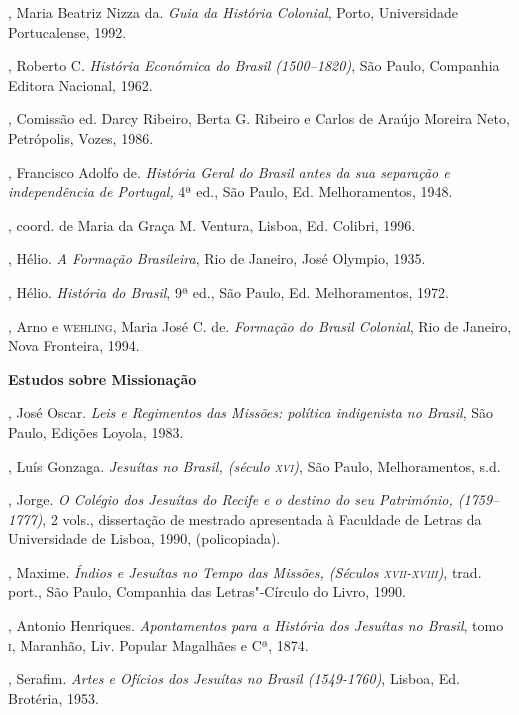 \begin{bibliohedra}
, Maria Beatriz Nizza da. \textit{Guia da História Colonial}, 
Porto, Universidade Portucalense, 1992.

, Roberto C. \textit{História Económica do Brasil
(1500--1820)}, São Paulo, Companhia Editora Nacional, 1962.

, Comissão ed. Darcy Ribeiro, Berta
G. Ribeiro e Carlos de Araújo Moreira Neto, Petrópolis, Vozes, 1986.

, Francisco Adolfo de. \textit{História Geral do Brasil antes
da sua separação e independência de Portugal, } 4ª ed., São Paulo, Ed.
Melhoramentos, 1948.

, coord. de
Maria da Graça M. Ventura, Lisboa, Ed. Colibri, 1996.

, Hélio. \textit{A Formação Brasileira}, Rio de Janeiro, José
Olympio, 1935.

, Hélio. \textit{História do Brasil}, 9ª ed., São Paulo, Ed.
Melhoramentos, 1972.

, Arno e \textsc{wehling}, Maria José C. de. \textit{Formação do Brasil
Colonial}, Rio de Janeiro, Nova Fronteira, 1994. 

\vspace*{2ex}
\scriptsize\textbf{Estudos sobre Missionação}

, José Oscar. \textit{Leis e Regimentos das Missões: política
indigenista no Brasil}, São Paulo, Edições Loyola, 1983.

, Luís Gonzaga. \textit{Jesuítas no Brasil, (século \textsc{xvi})}, São
Paulo, Melhoramentos, s.d.

, Jorge. \textit{O Colégio dos Jesuítas do Recife e o destino do
seu Património, (1759--1777)}, 2 vols., dissertação de mestrado
apresentada à Faculdade de Letras da Universidade de Lisboa, 1990, (policopiada).

, Maxime. \textit{Índios e Jesuítas no Tempo das Missões,
(Séculos \textsc{xvii}-\textsc{xviii})}, trad. port., São Paulo, Companhia das
Letras"-Círculo do Livro, 1990.

, Antonio Henriques. \textit{Apontamentos para a História dos
Jesuítas no Brasil}, tomo \textsc{i}, Maranhão, Liv. Popular Magalhães e Cª,
1874.

, Serafim. \textit{Artes e Ofícios dos Jesuítas no Brasil
(1549-1760)}, Lisboa, Ed. Brotéria, 1953.


\end{bibliohedra}

